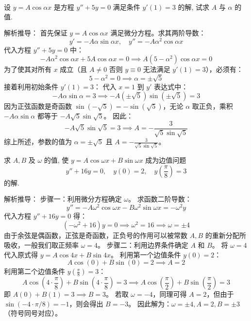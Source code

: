 \documentclass[lang=cn,11pt]{elegantbook}
\begin{document}
\begin{exercise}[含参方程的求解]
设 $y=A\cos\alpha x$ 是方程 $y''+5y=0$ 满足条件 $y'(1)=3$ 的解, 试求 $A$ 与 $\alpha$ 的值.
\end{exercise}
\begin{solution}
解析推导：
首先保证 $y=A\cos\alpha x$ 满足微分方程。求其两阶导数：
\[
y' = -A\alpha\sin\alpha x, \quad y'' = -A\alpha^2\cos\alpha x
\]
代入方程 $y''+5y=0$ 中：
\[
-A\alpha^2\cos\alpha x + 5A\cos\alpha x = 0 \implies A(5-\alpha^2)\cos\alpha x = 0
\]
为了使其对所有 $x$ 成立（且 $A \neq 0$ 否则 $y \equiv 0$ 无法满足 $y'(1)=3$），必须有：
\[
5 - \alpha^2 = 0 \implies \alpha = \pm\sqrt{5}
\]
接着利用初始条件 $y'(1)=3$：
代入 $x=1$ 到 $y'$ 表达式中：
\[
-A\alpha\sin\alpha = 3 \implies -A(\pm\sqrt{5})\sin(\pm\sqrt{5}) = 3
\]
因为正弦函数是奇函数 $\sin(-\sqrt{5}) = -\sin(\sqrt{5})$，无论 $\alpha$ 取正负，乘积 $-A\alpha\sin\alpha$ 都等于 $-A\sqrt{5}\sin\sqrt{5}$。
因此：
\[
-A\sqrt{5}\sin\sqrt{5} = 3 \implies A = -\frac{3}{\sqrt{5}\sin\sqrt{5}}
\]
综上所述，参数的值为 $\alpha = \pm\sqrt{5}$ 且 $A = -\frac{3}{\sqrt{5}\sin\sqrt{5}}$。
\end{solution}

\begin{exercise}[边值问题求解]
求 $A,B$ 及 $\omega$ 的值, 使 $y=A\cos\omega x+B\sin\omega x$ 成为边值问题
\[
y''+16y=0,\quad y(0)=2,\quad y\left(\frac{\pi}{8}\right)=3
\]
的解.
\end{exercise}
\begin{solution}
解析推导：
步骤一：利用微分方程确定 $\omega$。
求函数二阶导数：
\[
y'' = -A\omega^2\cos\omega x - B\omega^2\sin\omega x = -\omega^2 y
\]
代入方程 $y''+16y=0$ 得：
\[
(-\omega^2 + 16)y = 0 \implies \omega^2 = 16 \implies \omega = \pm 4
\]
由于余弦是偶函数，正弦是奇函数，正负号的作用可以被常数 $A, B$ 的重新分配所吸收，一般我们取正频率 $\omega = 4$。
步骤二：利用边界条件确定 $A$ 和 $B$。
将 $\omega = 4$ 代入原式得 $y = A\cos 4x + B\sin 4x$。
利用第一个边值条件 $y(0) = 2$：
\[
A\cos(0) + B\sin(0) = 2 \implies A = 2
\]
利用第二个边值条件 $y\left(\frac{\pi}{8}\right) = 3$：
\[
A\cos\left(4 \cdot \frac{\pi}{8}\right) + B\sin\left(4 \cdot \frac{\pi}{8}\right) = 3 \implies A\cos\left(\frac{\pi}{2}\right) + B\sin\left(\frac{\pi}{2}\right) = 3
\]
即 $A(0) + B(1) = 3 \implies B = 3$。
若取 $\omega = -4$，同理可得 $A=2$，但由于 $\sin(-4 \cdot \pi/8) = -1$，则会得出 $B=-3$。
因此解为：$\omega = \pm 4, A = 2, B = \pm 3$ （符号同号对应）。
\end{solution}
\end{document}
